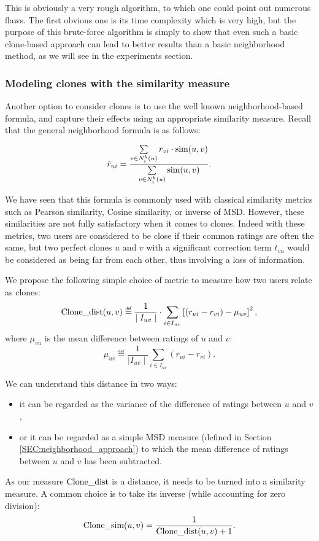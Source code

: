 This is obviously a very rough algorithm, to which one could point out numerous
flaws. The first obvious one is its time complexity which is very high, but the
purpose of this brute-force algorithm is simply to show that even such a basic
clone-based approach can lead to better results than a basic neighborhood
method, as we will see in the experiments section.

\subsubsection{Modeling clones with the similarity measure}
Another option to consider clones is to use the well known neighborhood-based
formula, and capture their effects using an appropriate similarity measure.
Recall that the general neighborhood formula is as follows:

$$\hat{r}_{ui} = \frac{\sum\limits_{v \in N_i^k(u)} r_{vi} \cdot \text{sim}(u, v)}
{\sum\limits_{v \in N_i^k(u)}\text{sim}(u, v)}.$$

We have seen that this formula is commonly used with classical similarity
metrics such as Pearson similarity, Cosine similarity, or inverse of MSD.
However, these similarities are not fully satisfactory when it comes to
clones. Indeed with these metrics, two users are considered to be close if
their common ratings are often the same, but two perfect clones $u$ and $v$
with a significant correction term $t_{vu}$ would be considered as being far from
each other, thus involving a loss of information.

We propose the following simple choice of metric to measure how two users
relate as clones:
$$\clonedist(u, v) \eqdef  \frac{1}{\mid I_{uv} \mid} \cdot
\sum\limits_{i \in I_{uv}} \left[(r_{ui} - r_{vi}) - \mu_{uv}\right]^2,$$
where $\mu_{vu}$ is the mean difference between ratings of $u$ and $v$:
$$\mu_{uv} \eqdef \frac{1}{\mid I_{uv}\mid}\sum_{i \in I_{uv}} (r_{ui} -
r_{vi}).$$

We can understand this distance in two ways:
\begin{itemize}
\item it can be regarded as the variance of the difference of ratings between
  $u$ and $v$,
\item or it can be regarded as a simple MSD measure (defined in Section
  \ref{SEC:neighborhood_approach}) to which the mean difference of ratings between $u$ and $v$ has
    been subtracted.
  \end{itemize}

As our measure $\text{Clone\_dist}$ is a distance, it needs to be turned into 
a similarity measure. A common choice is to take its inverse (while accounting
for zero division):
$$\text{Clone\_sim}(u, v) = \frac{1}{\text{Clone\_dist}(u, v) + 1}.$$

